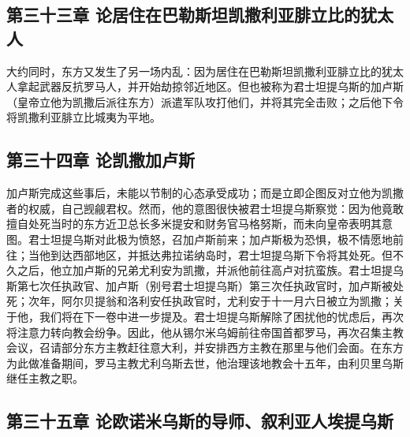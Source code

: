 
\subsection{第三十三章 论居住在巴勒斯坦凯撒利亚腓立比的犹太人}

大约同时，东方又发生了另一场内乱：因为居住在巴勒斯坦凯撒利亚腓立比的犹太人拿起武器反抗罗马人，并开始劫掠邻近地区。但也被称为君士坦提乌斯的加卢斯（皇帝立他为凯撒后派往东方）派遣军队攻打他们，并将其完全击败；之后他下令将凯撒利亚腓立比城夷为平地。\par


\subsection{第三十四章 论凯撒加卢斯}

加卢斯完成这些事后，未能以节制的心态承受成功；而是立即企图反对立他为凯撒者的权威，自己觊觎君权。然而，他的意图很快被君士坦提乌斯察觉：因为他竟敢擅自处死当时的东方近卫总长多米提安和财务官马格努斯，而未向皇帝表明其意图。君士坦提乌斯对此极为愤怒，召加卢斯前来；加卢斯极为恐惧，极不情愿地前往；当他到达西部地区，并抵达弗拉诺纳岛时，君士坦提乌斯下令将其处死。但不久之后，他立加卢斯的兄弟尤利安为凯撒，并派他前往高卢对抗蛮族。君士坦提乌斯第七次任执政官、加卢斯（别号君士坦提乌斯）第三次任执政官时，加卢斯被处死；次年，阿尔贝提翁和洛利安任执政官时，尤利安于十一月六日被立为凯撒；关于他，我们将在下一卷中进一步提及。君士坦提乌斯解除了困扰他的忧虑后，再次将注意力转向教会纷争。因此，他从锡尔米乌姆前往帝国首都罗马，再次召集主教会议，召请部分东方主教赶往意大利，并安排西方主教在那里与他们会面。在东方为此做准备期间，罗马主教尤利乌斯去世，他治理该地教会十五年，由利贝里乌斯继任主教之职。\par


\subsection{第三十五章 论欧诺米乌斯的导师、叙利亚人埃提乌斯}

